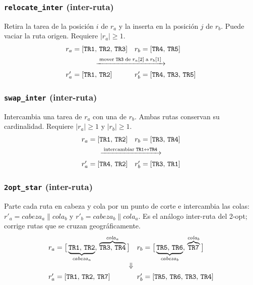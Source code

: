 \documentclass[11pt,a4paper]{article}
\theoremstyle{definition}
\theoremstyle{remark}
\begin{document}
\subsubsection{\texttt{relocate\_inter} (inter-ruta)}
Retira la tarea de la posición $i$ de $r_a$ y la inserta en la posición $j$
de $r_b$. Puede vaciar la ruta origen. Requiere $|r_a| \geq 1$.
\[
    \begin{array}{ll}
        r_a = [\mathtt{TR1},\,\mathtt{TR2},\,\mathtt{TR3}]
        & r_b = [\mathtt{TR4},\,\mathtt{TR5}] \\[4pt]
        \multicolumn{2}{c}{\xrightarrow{\;\text{mover}\;\mathtt{TR3}\;\text{de}\;r_a[2]\;\text{a}\;r_b[1]\;}} \\[4pt]
        r'_a = [\mathtt{TR1},\,\mathtt{TR2}]
        & r'_b = [\mathtt{TR4},\,\mathtt{TR3},\,\mathtt{TR5}]
    \end{array}
\]

\subsubsection{\texttt{swap\_inter} (inter-ruta)}
Intercambia una tarea de $r_a$ con una de $r_b$. Ambas rutas conservan su
cardinalidad. Requiere $|r_a| \geq 1$ y $|r_b| \geq 1$.
\[
    \begin{array}{ll}
        r_a = [\mathtt{TR1},\,\mathtt{TR2}]
        & r_b = [\mathtt{TR3},\,\mathtt{TR4}] \\[4pt]
        \multicolumn{2}{c}{\xrightarrow{\;\text{intercambiar}\;\mathtt{TR1}\leftrightarrow\mathtt{TR4}\;}} \\[4pt]
        r'_a = [\mathtt{TR4},\,\mathtt{TR2}]
        & r'_b = [\mathtt{TR3},\,\mathtt{TR1}]
    \end{array}
\]

\subsubsection{\texttt{2opt\_star} (inter-ruta)}
Parte cada ruta en cabeza y cola por un punto de corte e intercambia las
colas: $r'_a = \mathit{cabeza}_a \| \mathit{cola}_b$ y
$r'_b = \mathit{cabeza}_b \| \mathit{cola}_a$. Es el análogo inter-ruta del
2-opt; corrige rutas que se cruzan geográficamente.
\[
    \begin{array}{ll}
        r_a = \bigl[\,\underbrace{\mathtt{TR1},\,\mathtt{TR2}}_{\mathit{cabeza}_a},\,
                     \overbrace{\mathtt{TR3},\,\mathtt{TR4}}^{\mathit{cola}_a}\,\bigr]
        &
        r_b = \bigl[\,\underbrace{\mathtt{TR5},\,\mathtt{TR6}}_{\mathit{cabeza}_b},\,
                     \overbrace{\mathtt{TR7}}^{\mathit{cola}_b}\,\bigr] \\[10pt]
        \multicolumn{2}{c}{\Downarrow} \\[4pt]
        r'_a = [\mathtt{TR1},\,\mathtt{TR2},\,\mathtt{TR7}]
        &
        r'_b = [\mathtt{TR5},\,\mathtt{TR6},\,\mathtt{TR3},\,\mathtt{TR4}]
    \end{array}
\]
\end{document}
